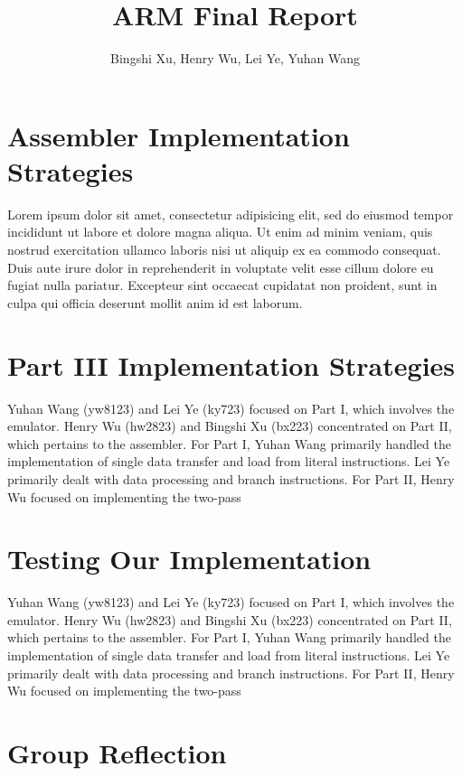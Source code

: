 \documentclass[11pt]{article}
\begin{document}
\title{ARM Final Report}
\author{Bingshi Xu, Henry Wu, Lei Ye, Yuhan Wang}

\maketitle

\section{Assembler Implementation Strategies}

Lorem ipsum dolor sit amet, consectetur adipisicing elit, sed do eiusmod tempor
incididunt ut labore et dolore magna aliqua. Ut enim ad minim veniam, quis
nostrud exercitation ullamco laboris nisi ut aliquip ex ea commodo consequat.
Duis aute irure dolor in reprehenderit in voluptate velit esse cillum dolore eu
fugiat nulla pariatur. Excepteur sint occaecat cupidatat non proident, sunt in
culpa qui officia deserunt mollit anim id est laborum.

\section{Part III Implementation Strategies}

Yuhan Wang (yw8123) and Lei Ye (ky723) focused on Part I, which involves the emulator. Henry Wu (hw2823) and Bingshi Xu (bx223) concentrated on Part II, which pertains to the assembler.
For Part I, Yuhan Wang primarily handled the implementation of single data transfer and load from literal instructions. Lei Ye primarily dealt with data processing and branch instructions.
For Part II, Henry Wu focused on implementing the two-pass 

\section{Testing Our Implementation}

Yuhan Wang (yw8123) and Lei Ye (ky723) focused on Part I, which involves the emulator. Henry Wu (hw2823) and Bingshi Xu (bx223) concentrated on Part II, which pertains to the assembler.
For Part I, Yuhan Wang primarily handled the implementation of single data transfer and load from literal instructions. Lei Ye primarily dealt with data processing and branch instructions.
For Part II, Henry Wu focused on implementing the two-pass 

\section{Group Reflection}
\end{document}
